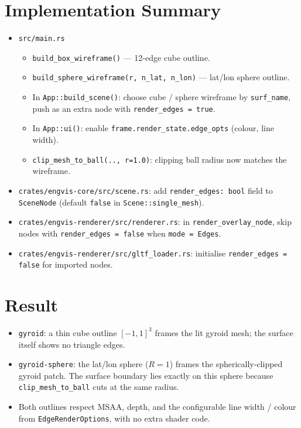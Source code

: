 \documentclass[11pt]{article}
\begin{document}
\section{Implementation Summary}

\begin{itemize}
  \item \texttt{src/main.rs}
        \begin{itemize}
          \item \texttt{build\_box\_wireframe()} --- 12-edge cube outline.
          \item \texttt{build\_sphere\_wireframe(r, n\_lat, n\_lon)} ---
                lat/lon sphere outline.
          \item In \texttt{App::build\_scene()}: choose
                cube / sphere wireframe by \texttt{surf\_name}, push as
                an extra node with \texttt{render\_edges = true}.
          \item In \texttt{App::ui()}: enable
                \texttt{frame.render\_state.edge\_opts}
                (colour, line width).
          \item \texttt{clip\_mesh\_to\_ball(.., r=1.0)}: clipping ball
                radius now matches the wireframe.
        \end{itemize}
  \item \texttt{crates/engvis-core/src/scene.rs}: add
        \texttt{render\_edges: bool} field to \texttt{SceneNode} (default
        \texttt{false} in \texttt{Scene::single\_mesh}).
  \item \texttt{crates/engvis-renderer/src/renderer.rs}: in
        \texttt{render\_overlay\_node}, skip nodes with
        \texttt{render\_edges = false} when \texttt{mode = Edges}.
  \item \texttt{crates/engvis-renderer/src/gltf\_loader.rs}: initialise
        \texttt{render\_edges = false} for imported nodes.
\end{itemize}

\section{Result}

\begin{itemize}
  \item \texttt{gyroid}: a thin cube outline
        $[-1,1]^3$ frames the lit gyroid mesh; the surface itself shows
        no triangle edges.
  \item \texttt{gyroid-sphere}: the lat/lon sphere ($R=1$) frames the
        spherically-clipped gyroid patch.  The surface boundary lies
        exactly on this sphere because \texttt{clip\_mesh\_to\_ball}
        cuts at the same radius.
  \item Both outlines respect MSAA, depth, and the configurable line
        width / colour from \texttt{EdgeRenderOptions}, with no extra
        shader code.
\end{itemize}
\end{document}
